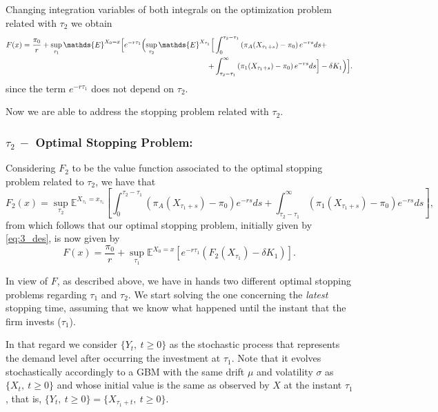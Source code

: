 Changing integration variables of both integrals on the optimization problem related with $\tau_2$ we obtain
\begin{equation}
	\begin{split}
		F(x)=\frac{\pi_0}{r}+\sup _{\tau_1} \mathds{E}^{X_0=x} \Bigl[ e^{-r \tau_1} \Bigl(  \sup_{\tau_2} \mathds{E}^{X_{\tau_1}} \Bigl[ &\int_0^{\tau_2-\tau_1} \left( \pi_A(X_{\tau_1+s})-\pi_0 \right) e^{-rs}ds +\\
		+&\int_{\tau_2-\tau_1}^\infty \left( \pi_1(X_{\tau_1+s})-\pi_0 \right) e^{-rs}ds  \Bigr]-\delta K_1 \Bigr) \Bigr].
	\end{split}
	\label{eq:3w}
\end{equation}
since the term $e^{-r \tau_1}$ does not depend on $\tau_2$.

Now we are able to address the stopping problem related with $\tau_2$.

\subsubsection{$\tau_2 \ - $ Optimal Stopping Problem:}

Considering $F_2$ to be the value function associated to the optimal stopping problem related to $\tau_2$, we have that
\begin{equation}
F_2(x)=\sup_{\tau_2} \mathds{E}^{X_{\tau_1}=x_{\tau_1}} \left[ \int_0^{\tau_2-\tau_1} \left( \pi_A(X_{\tau_1+s})-\pi_0 \right) e^{-rs}ds + \int_{\tau_2-\tau_1}^\infty \left( \pi_1(X_{\tau_1+s})-\pi_0 \right) e^{-rs}ds  \right],
\label{eq:34}
\end{equation}
from which follows that our optimal stopping problem, initially given by \eqref{eq:3_des}, is now given by
\begin{equation}
F(x)=\frac{\pi_0}{r}+\sup _{\tau_1} \mathds{E}^{X_0=x} \left[ e^{-r \tau_1}(F_2(X_{\tau_1})-\delta K_1 )\right].
\label{eq:35}
\end{equation}

In view of $F$, as described above, we have in hands two different optimal stopping problems regarding $\tau_1$ and $\tau_2$.
We start solving the one concerning the \textit{latest} stopping time, assuming that we know what happened until the
instant that the firm invests ($\tau_1$).

In that regard we consider $\{Y_t, \ t\geq0\}$ as the stochastic process that represents the demand level after occurring the investment at $\tau_1$.
Note that it evolves stochastically accordingly to a GBM with the same drift $\mu$ and volatility $\sigma$ as $\{X_t, \ t\geq0\}$ and whose initial value is the same as observed by $X$ at the instant $\tau_1$, that is, $\{Y_t, \ t\geq0\} = \{X_{\tau_1+t}, \ t\geq0\}$.

